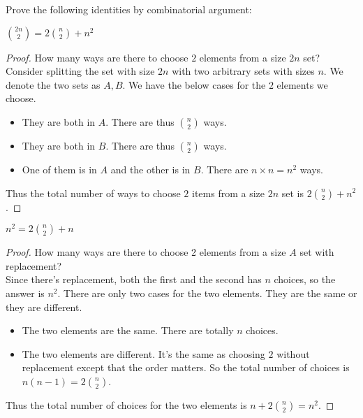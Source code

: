\documentclass[11pt]{article}
\begin{document}
\newcommand{\sblank}{\vspace{1in}}
Prove the following identities by combinatorial argument:
\begin{Parts}

    \Part $\binom{2n}{2} = 2 \binom{n}{2} + n^2$
    
    \begin{Answer}
        \begin{proof}
            How many ways are there to choose $2$ elements from a size $2n$ set? \\
            Consider splitting the set with size $2n$ with two arbitrary sets with sizes $n$. 
            We denote the two sets as $A,B$. We have the below cases for the $2$ elements we choose. 
            \begin{itemize}
                \item They are both in $A$. There are thus ${n \choose 2}$ ways. 
                \item They are both in $B$. There are thus ${n \choose 2}$ ways. 
                \item One of them is in $A$ and the other is in $B$. There are $n \times n = n^2$ ways. 
            \end{itemize}
            Thus the total number of ways to choose $2$ items from a size $2n$ set is $2{n \choose 2} + n^2$. 
        \end{proof}
    \end{Answer}

  	\Part $n^2 = 2 \binom{n}{2} + n$

    \begin{Answer}
        \begin{proof}
            How many ways are there to choose 2 elements from a size $A$ set with replacement? \\
            Since there's replacement, both the first and the second has $n$ choices, so the answer
            is $n^2$. There are only two cases for the two elements. They are the same or they are different. 
            \begin{itemize}
                \item The two elements are the same. There are totally $n$ choices. 
                \item The two elements are different. It's the same as choosing $2$ without replacement except 
                that the order matters. So the total number of choices is $n(n - 1) = 2{n \choose 2}$. 
            \end{itemize}
            Thus the total number of choices for the two elements is $n + 2{n \choose 2} = n^2$. 
        \end{proof}
    \end{Answer}


\end{Parts}
\end{document}
